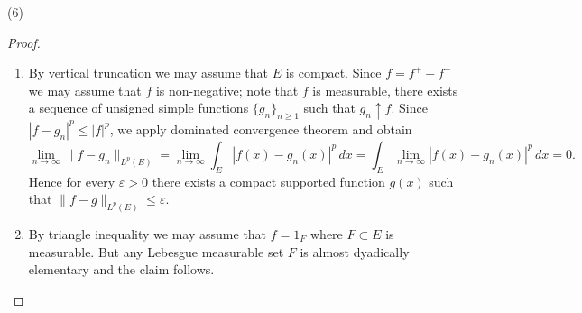 \documentclass[a4paper]{article}
\begin{document}
(6)\begin{proof}
\ \begin{enumerate}[label = (\alph*)]
    \item By vertical truncation we may assume that $E$ is compact. Since $f = f^+ - f^-$ we may assume that $f$ is 
    non-negative; note that $f$ is measurable, there exists a sequence of unsigned simple functions $\{g_n\}_{n \geq 1}$
    such that $g_n \uparrow f$. Since $|f - g_n|^p \leq |f|^p$, we apply dominated convergence theorem and obtain$$
    \lim_{n \to \infty} \|f - g_n\|_{L^p(E)} = \lim_{n \to \infty} \int_E |f(x) - g_n(x)|^p\,dx = 
    \int_E \lim_{n\to\infty} |f(x) - g_n(x)|^p\,dx = 0.
    $$Hence for every $\varepsilon > 0$ there exists a compact supported function $g(x)$ such that 
    $\|f - g\|_{L^p(E)} \leq \varepsilon$.
    \item By triangle inequality we may assume that $f = 1_F$ where $F \subset E$ is measurable. But any Lebesgue
    measurable set $F$ is almost dyadically elementary and the claim follows.\qedhere
\end{enumerate}
\end{proof}
\end{document}

